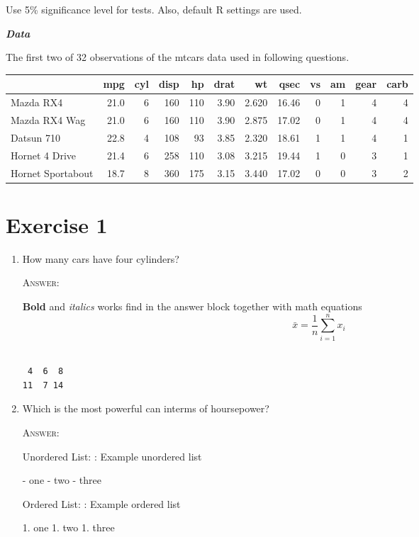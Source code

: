 \documentclass[
11pt,%
a4paper,%
]%
{article}%
\newenvironment{answer}
  {\color{RoyalBlue}\textsc{Answer:}}
  {}
\begin{document}
Use 5\% significance level for tests. Also, default R settings are used.

\textbf{\emph{Data}}

The first two of 32 observations of the mtcars data used in following
questions.

\begin{longtable}[]{@{}lrrrrrrrrrrr@{}}
\toprule
& mpg & cyl & disp & hp & drat & wt & qsec & vs & am & gear &
carb\tabularnewline
\midrule
\endhead
Mazda RX4 & 21.0 & 6 & 160 & 110 & 3.90 & 2.620 & 16.46 & 0 & 1 & 4 &
4\tabularnewline
Mazda RX4 Wag & 21.0 & 6 & 160 & 110 & 3.90 & 2.875 & 17.02 & 0 & 1 & 4
& 4\tabularnewline
Datsun 710 & 22.8 & 4 & 108 & 93 & 3.85 & 2.320 & 18.61 & 1 & 1 & 4 &
1\tabularnewline
Hornet 4 Drive & 21.4 & 6 & 258 & 110 & 3.08 & 3.215 & 19.44 & 1 & 0 & 3
& 1\tabularnewline
Hornet Sportabout & 18.7 & 8 & 360 & 175 & 3.15 & 3.440 & 17.02 & 0 & 0
& 3 & 2\tabularnewline
\bottomrule
\end{longtable}

\hypertarget{exercise-1}{%
\section{Exercise 1}\label{exercise-1}}

\begin{enumerate}
\def\labelenumi{\alph{enumi})}
\item
  How many cars have four cylinders?

  \begin{answer}

  \textbf{Bold} and \emph{italics} works find in the answer block
  together with math equations
  \[\bar{x} = \frac{1}{n}\sum_{i=1}^{n}{x_i}\]

\begin{verbatim}

 4  6  8 
11  7 14 
\end{verbatim}

  \end{answer}
\item
  Which is the most powerful can interms of hoursepower?

  \begin{answer}

   Unordered List:
   : Example unordered list

     - one
     - two
     - three

   Ordered List:
   : Example ordered list

     1. one
     1. two
     1. three

   \end{answer}
\end{enumerate}
\end{document}
